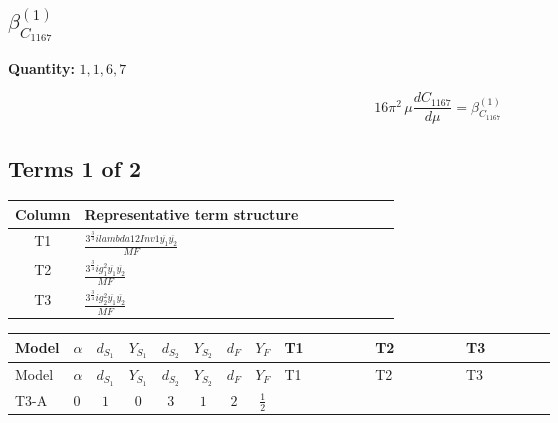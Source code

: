\documentclass[8pt]{article}
\begin{document}
\begin{landscape}
\section*{$\beta_{C_{1167}}^{(1)}$}
\noindent\textbf{Quantity: }$\mathrm{1,1,6,7}$\par\smallskip
\[16\pi^2\,\mu\frac{d C_{1167}}{d\mu}=\beta_{C_{1167}}^{(1)}\]
\subsection*{Terms 1 of 2}
\begin{center}
\begin{tabular}{@{}c >{\raggedright\arraybackslash}p{0.82\linewidth}@{}}
\toprule
Column & Representative term structure \\
\midrule
T1 & \(\displaystyle \frac{3^{\frac{3}{4}} i lambda12Inv1 \overline{y_{1}} \overline{y_{2}}}{MF}\) \\
\midrule
T2 & \(\displaystyle \frac{3^{\frac{3}{4}} i g_{1}^{2} \overline{y_{1}} \overline{y_{2}}}{MF}\) \\
\midrule
T3 & \(\displaystyle \frac{3^{\frac{3}{4}} i g_{2}^{2} \overline{y_{1}} \overline{y_{2}}}{MF}\) \\
\midrule
\bottomrule
\end{tabular}
\end{center}
\smallskip
\tiny
\begin{longtable}{@{}llcccccc >{\raggedright\arraybackslash}p{0.21\linewidth} >{\raggedright\arraybackslash}p{0.21\linewidth} >{\raggedright\arraybackslash}p{0.21\linewidth}@{}}
\toprule
Model & $\alpha$ & $d_{S_1}$ & $Y_{S_1}$ & $d_{S_2}$ & $Y_{S_2}$ & $d_F$ & $Y_F$ & T1 & T2 & T3 \\
\midrule
\endfirsthead
\toprule
Model & $\alpha$ & $d_{S_1}$ & $Y_{S_1}$ & $d_{S_2}$ & $Y_{S_2}$ & $d_F$ & $Y_F$ & T1 & T2 & T3 \\
\midrule
\endhead
T3-A & $0$ & $1$ & $0$ & $3$ & $1$ & $2$ & $\frac{1}{2}$ & \scriptsize\adjustbox{max width=\linewidth}{$\begin{gathered} \frac{3^{\frac{3}{4}} i lambda12Inv1 \overline{y_{1}} \overline{y_{2}}}{6 MF}\end{gathered}$} & \scriptsize\adjustbox{max width=\linewidth}{$\begin{gathered} \frac{3^{\frac{3}{4}} i g_{1}^{2} \overline{y_{1}} \overline{y_{2}}}{8 MF}\end{gathered}$} & \scriptsize\adjustbox{max width=\linewidth}{$\begin{gathered} \frac{11 \cdot 3^{\frac{3}{4}} i g_{2}^{2} \overline{y_{1}} \overline{y_{2}}}{8 MF}\end{gathered}$} \\

\end{longtable}
\end{landscape}
\end{document}
